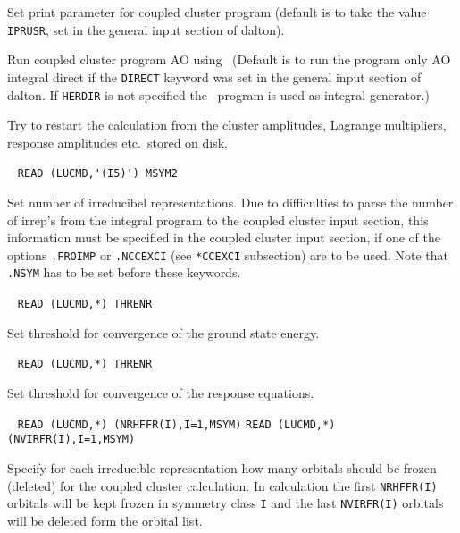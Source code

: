 \begin{description}
       Set print parameter for coupled cluster program
       (default is to take the value \verb+IPRUSR+, set in the general
       input section of dalton).
%
\item[\Key{HERDIR}] 
       Run coupled cluster program AO  using \her\
       (Default is to run the program only AO integral direct
       if the \verb+DIRECT+ keyword was set in the general
       input section of dalton. If \verb+HERDIR+ is not specified the \eri\
       program is used as integral generator.) 
%
\item[\Key{RESTAR}] 
       Try to restart the calculation from the cluster amplitudes,
       Lagrange multipliers, response amplitudes etc.\ stored on
       disk.
%
\item[\Key{NSYM  }] \verb| |\newline
       \verb|READ (LUCMD,'(I5)') MSYM2|

       Set number of irreducibel representations. 
       Due to difficulties to parse the number of irrep's from
       the integral program to the coupled cluster input section,
       this information must be specified in the coupled cluster
       input section, if one of the options \verb+.FROIMP+ or
       \verb+.NCCEXCI+ (see \verb+*CCEXCI+ subsection) are to be used.
       Note that \verb+.NSYM+ has to be set before these keywords.
 
\item[\Key{THRENR}] \verb| |\newline
       \verb|READ (LUCMD,*) THRENR|

       Set threshold for convergence of the ground state energy.
 
\item[\Key{THRLEQ}] \verb| |\newline
       \verb|READ (LUCMD,*) THRENR|

       Set threshold for convergence of the response equations.
 
\item[\Key{FROIMP}] \verb| |\newline
      \verb|READ (LUCMD,*) (NRHFFR(I),I=1,MSYM)|\newline
      \verb|READ (LUCMD,*) (NVIRFR(I),I=1,MSYM)|

      Specify for each irreducible representation how
      many orbitals should be frozen (deleted) for the coupled
      cluster calculation. In calculation the first \verb+NRHFFR(I)+
      orbitals will be kept frozen in symmetry class \verb+I+ and
      the last \verb+NVIRFR(I)+ orbitals will be deleted form the 
      orbital list.
 

\end{description}
